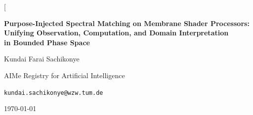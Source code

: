 \documentclass[11pt,twocolumn,a4paper]{article}
\theoremstyle{definition}
\theoremstyle{remark}
\begin{document}

\twocolumn[
\begin{center}
{\LARGE\bfseries Purpose-Injected Spectral Matching on Membrane Shader Processors:\\[6pt]
Unifying Observation, Computation, and Domain Interpretation\\[4pt] in Bounded Phase Space}

\vspace{1.2cm}

{\large Kundai Farai Sachikonye}\par
\vspace{4pt}
AIMe Registry for Artificial Intelligence\par
\texttt{kundai.sachikonye@wzw.tum.de}

\vspace{0.8cm}

\today

\vspace{0.8cm}


\end{center}
\end{document}
